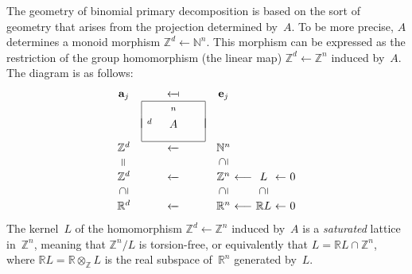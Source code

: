\documentclass[12pt]{amsart}
\numberwithin{equation}{section}
\theoremstyle{definition}
\begin{document}
The geometry of binomial primary decomposition is based on the sort of
geometry that arises from the projection determined by~$A$.  To be
more precise, $A$ determines a monoid morphism ${\mathbb{Z}}^d {\leftarrow} {\mathbb{N}}^n$.
This morphism can be expressed as the restriction of the group
homomorphism (the linear map) ${\mathbb{Z}}^d {\leftarrow} {\mathbb{Z}}^n$ induced by~$A$.  The
diagram is as follows:
$$\begin{array}{c@{\ }c@{\ }c@{\ }c@{\ }c@{\ }c@{\ }c}
        {\mathbf{a}}_j & {\mathord\leftarrow \mkern-6mu
	\cleaders\hbox{$\mkern-2mu \mathord- \mkern-2mu$}\hfill
	\mkern-6mu\mathord-\mathord{\raisebox{.5pt}{$\!\shortmid$}}} & {\mathbf{e}}_j
\\            &\ \ \begin{array}{|c|}
               \hline \scriptstyle n\\\scriptstyle d\hfill\\[-2ex]
               \qquad A\qquad\\[2ex]\hline
               \end{array}\ \ &
\\
       {\mathbb{Z}}^d    & {\mathord\leftarrow \mkern-6mu
	\cleaders\hbox{$\mkern-2mu \mathord- \mkern-2mu$}\hfill
	\mkern-6mu \mathord-} &    {\mathbb{N}}^n
\\
     {\mathrel{\rotatebox[origin=c]{90}{$=$}}}  &             & {\mathrel{\rotatebox[origin=c]{90}{$\supseteq$}}} &
\\[.5ex]
       {\mathbb{Z}}^d    & {\mathord\leftarrow \mkern-6mu
	\cleaders\hbox{$\mkern-2mu \mathord- \mkern-2mu$}\hfill
	\mkern-6mu \mathord-} &    {\mathbb{Z}}^n    & {\longleftarrow} &      L      & {\leftarrow} & 0
\\
    {\mathrel{\rotatebox[origin=c]{90}{$\supseteq$}}} &             & {\mathrel{\rotatebox[origin=c]{90}{$\supseteq$}}} &        & {\mathrel{\rotatebox[origin=c]{90}{$\supseteq$}}} &       & 
\\[.5ex]
       {\mathbb{R}}^d    & {\mathord\leftarrow \mkern-6mu
	\cleaders\hbox{$\mkern-2mu \mathord- \mkern-2mu$}\hfill
	\mkern-6mu \mathord-} &    {\mathbb{R}}^n    & {\longleftarrow} &   {\mathbb{R}} L     & {\leftarrow} & 0
\end{array}
$$
The kernel~$L$ of the homomorphism ${\mathbb{Z}}^d {\leftarrow} {\mathbb{Z}}^n$ induced by~$A$
is a \emph{saturated} lattice in~${\mathbb{Z}}^n$, meaning that ${\mathbb{Z}}^n/L$ is
torsion-free, or equivalently that $L = {\mathbb{R}} L \cap {\mathbb{Z}}^n$, where ${\mathbb{R}}
L = {\mathbb{R}} \otimes_{\mathbb{Z}} L$ is the real subspace of~${\mathbb{R}}^n$ generated
by~$L$.
\end{document}
